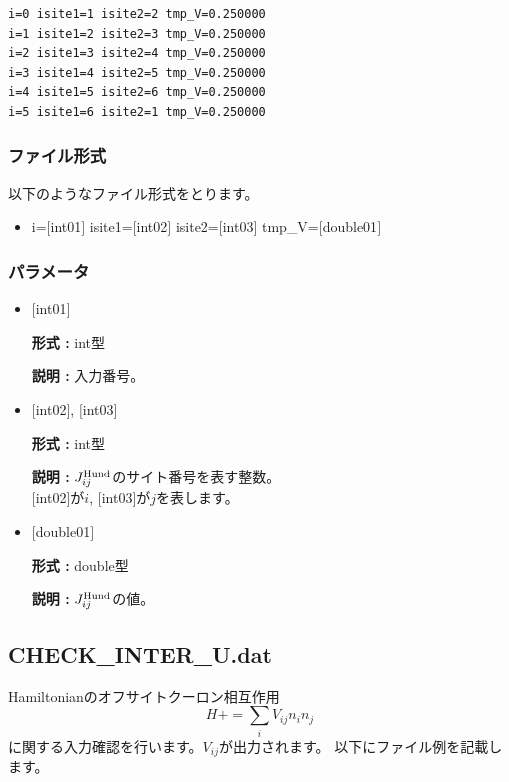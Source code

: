 \begin{minipage}{12.5cm}
\begin{screen}
\begin{verbatim}
i=0 isite1=1 isite2=2 tmp_V=0.250000 
i=1 isite1=2 isite2=3 tmp_V=0.250000 
i=2 isite1=3 isite2=4 tmp_V=0.250000 
i=3 isite1=4 isite2=5 tmp_V=0.250000 
i=4 isite1=5 isite2=6 tmp_V=0.250000 
i=5 isite1=6 isite2=1 tmp_V=0.250000 
\end{verbatim}
\end{screen}
\end{minipage}

\subsubsection{ファイル形式}
以下のようなファイル形式をとります。
 \begin{itemize}
   \item  i=$[$int01$]$ isite1=$[$int02$]$ isite2=$[$int03$]$ tmp\_V=$[$double01$]$ 
 \end{itemize}
 
\subsubsection{パラメータ}
 \begin{itemize}

    \item  $[$int01$]$ 
   
    {\bf 形式 :} int型

   {\bf 説明 :} 入力番号。
      
   \item  $[$int02$]$, $[$int03$]$
   
    {\bf 形式 :} int型

    {\bf 説明 :}  $J_{ij}^{\rm Hund}$のサイト番号を表す整数。 \\
    $[$int02$]$が$i$, $[$int03$]$が$j$を表します。
 
   \item  $[$double01$]$ 
   
    {\bf 形式 :} double型

   {\bf 説明 :} $J_{ij}^{\rm Hund}$の値。
\end{itemize}

\newpage
\subsection{CHECK\_INTER\_U.dat}
Hamiltonianのオフサイトクーロン相互作用
\begin{equation}
H+=\sum_{i} V_{ij} n_{i} n_{j}
\end{equation}
に関する入力確認を行います。$V_{ij}$が出力されます。
以下にファイル例を記載します。

